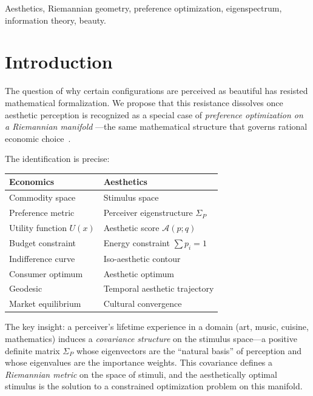 \documentclass[journal]{IEEEtran}
\theoremstyle{definition}
\theoremstyle{remark}
\begin{document}
\begin{IEEEkeywords}
Aesthetics, Riemannian geometry, preference optimization, eigenspectrum,
information theory, beauty.
\end{IEEEkeywords}


\section{Introduction}
\label{sec:intro}

The question of why certain configurations are perceived as beautiful
has resisted mathematical formalization.  We propose that this
resistance dissolves once aesthetic perception is recognized as a
special case of \emph{preference optimization on a Riemannian manifold}
---the same mathematical structure that governs rational economic
choice~\cite{debreu1972smooth, mas1995microeconomic}.

The identification is precise:

\begin{center}
\begin{tabular}{ll}
\toprule
\textbf{Economics} & \textbf{Aesthetics} \\
\midrule
Commodity space & Stimulus space \\
Preference metric & Perceiver eigenstructure $\Sigma_P$ \\
Utility function $U(x)$ & Aesthetic score $\mathcal{A}(p; q)$ \\
Budget constraint & Energy constraint $\sum p_i = 1$ \\
Indifference curve & Iso-aesthetic contour \\
Consumer optimum & Aesthetic optimum \\
Geodesic & Temporal aesthetic trajectory \\
Market equilibrium & Cultural convergence \\
\bottomrule
\end{tabular}
\end{center}

The key insight: a perceiver's lifetime experience in a domain (art,
music, cuisine, mathematics) induces a \emph{covariance structure} on
the stimulus space---a positive definite matrix $\Sigma_P$ whose
eigenvectors are the ``natural basis'' of perception and whose
eigenvalues are the importance weights.  This covariance defines a
\emph{Riemannian metric} on the space of stimuli, and the
aesthetically optimal stimulus is the solution to a constrained
optimization problem on this manifold.
\end{document}
